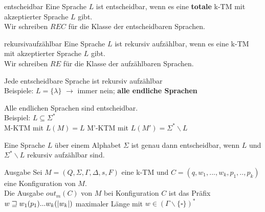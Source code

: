 \begin{defn}{entscheidbar}
    Eine Sprache $L$ ist entscheidbar, wenn es eine \textbf{totale} k-TM mit akzeptierter Sprache $L$ gibt.\\
    Wir schreiben $REC$ für die Klasse der entscheidbaren Sprachen. 
\end{defn}

\begin{defn}{rekursivaufzählbar}
    Eine Sprache $L$ ist rekursiv aufzählbar, wenn es eine k-TM mit akzeptierter Sprache $L$ gibt. \\
    Wir schreiben $RE$ für die Klasse der aufzählbaren Sprachen.
\end{defn}

\begin{bem}
    Jede entscheidbare Sprache ist rekursiv aufzählbar\\
    Beispiele: $L=\{\lambda\}$ $\rightarrow$ immer nein; \textbf{alle endliche Sprachen}\\
\end{bem}

\begin{bem}
    Alle endlichen Sprachen sind entscheidbar. \\
    Beispiel: $L \subseteq \Sigma^*$ \\
    M-KTM mit $L(M)=L$
    M'-KTM mit $L(M') = \Sigma^* \backslash L$
\end{bem}

\begin{bem}
    Eine Sprache $L$ über einem Alphabet $\Sigma$ ist genau dann entscheidbar, wenn $L$ und $\Sigma^*\backslash L$ rekursiv aufzählbar sind.
\end{bem}

\begin{defn}{Ausgabe}
    Sei $M = (Q, \Sigma, \Gamma, \Delta, s, F)$ eine k-TM und $C=(q,w_1,...,w_k,p_1,..,p_k)$ eine Konfiguration von $M$. \\

    Die Ausgabe $out_m(C)$ von $M$ bei Konfiguration $C$ ist das Präfix $w \sqsupseteq w_1(p_1)...w_k(|w_k|)$ maximaler Länge mit $w \in (\Gamma \backslash \{\square\})^*$
\end{defn}

